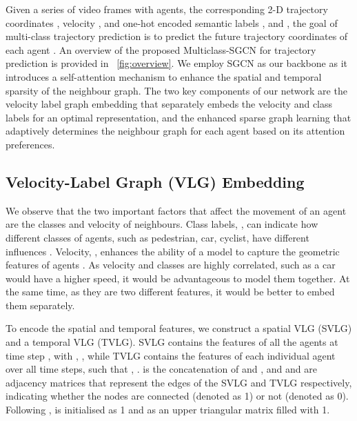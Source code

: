 \documentclass{article}
\begin{document}
Given a series of  video frames with  agents, the corresponding 2-D trajectory coordinates , velocity , and one-hot encoded semantic labels ,   and  , the goal of multi-class trajectory prediction is to predict the future trajectory coordinates of each agent   . An overview of the proposed Multiclass-SGCN for trajectory prediction is provided in \figurename~\ref{fig:overview}. We employ SGCN \cite{shi2021sgcn} as our backbone as it introduces a self-attention mechanism to enhance the spatial and temporal sparsity of the neighbour graph. The two key components of our network are the velocity label graph embedding that separately embeds the velocity and class labels for an optimal representation, and the enhanced sparse graph learning that adaptively determines the neighbour graph for each agent based on its attention preferences.














\subsection{Velocity-Label Graph (VLG) Embedding}
\label{sec:embedding}
We observe that the two important factors that affect the movement of an agent are the classes and velocity of neighbours. Class labels, , can indicate how different classes of agents, such as pedestrian, car, cyclist, have different influences \cite{rainbow2021semanticsstgcnn}. Velocity, , enhances the ability of a model to capture the geometric features of agents \cite{Mohamed2020socialstgcnn}. As velocity and classes are highly correlated, such as a car would have a higher speed, it would be advantageous to model them together. At the same time, as they are two different features, it would be better to embed them separately.




To encode the spatial and temporal features, we construct a spatial VLG (SVLG) and a temporal VLG (TVLG). SVLG contains the features of all the agents at time step , with , , while TVLG contains the features of each individual agent over all time steps, such that , .  is the concatenation of  and , and  and  are adjacency matrices that represent the edges of the SVLG and TVLG respectively, indicating whether the nodes are connected (denoted as 1) or not (denoted as 0). Following \cite{shi2021sgcn},  is initialised as 1 and  as an upper triangular matrix filled with 1.
\end{document}
